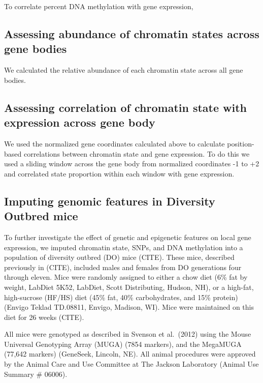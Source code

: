 \documentclass[10pt,letterpaper]{article}
\begin{document}
To correlate percent DNA methylation with gene expression,

\hypertarget{assessing-abundance-of-chromatin-states-across-gene-bodies}{%
\subsection{Assessing abundance of chromatin states across gene
bodies}\label{assessing-abundance-of-chromatin-states-across-gene-bodies}}

We calculated the relative abundance of each chromatin state across all
gene bodies.

\hypertarget{assessing-correlation-of-chromatin-state-with-expression-across-gene-body}{%
\subsection{Assessing correlation of chromatin state with expression
across gene
body}\label{assessing-correlation-of-chromatin-state-with-expression-across-gene-body}}

We used the normalized gene coordinates calculated above to calculate
position-based correlations between chromatin state and gene expression.
To do this we used a sliding window across the gene body from normalized
coordinates -1 to +2 and correlated state proportion within each window
with gene expression.

\hypertarget{imputing-genomic-features-in-diversity-outbred-mice}{%
\subsection{Imputing genomic features in Diversity Outbred
mice}\label{imputing-genomic-features-in-diversity-outbred-mice}}

To further investigate the effect of genetic and epigenetic features on
local gene expression, we imputed chromatin state, SNPs, and DNA
methylation into a population of diversity outbred (DO) mice (CITE).
These mice, described previously in (CITE), included males and females
from DO generations four through eleven. Mice were randomly assigned to
either a chow diet (6\% fat by weight, LabDiet 5K52, LabDiet, Scott
Distributing, Hudson, NH), or a high-fat, high-sucrose (HF/HS) diet
(45\% fat, 40\% carbohydrates, and 15\% protein) (Envigo Teklad
TD.08811, Envigo, Madison, WI). Mice were maintained on this diet for 26
weeks (CITE).

All mice were genotyped as described in Svenson et al.~(2012) using the
Mouse Universal Genotyping Array (MUGA) (7854 markers), and the MegaMUGA
(77,642 markers) (GeneSeek, Lincoln, NE). All animal procedures were
approved by the Animal Care and Use Committee at The Jackson Laboratory
(Animal Use Summary \# 06006).
\end{document}
